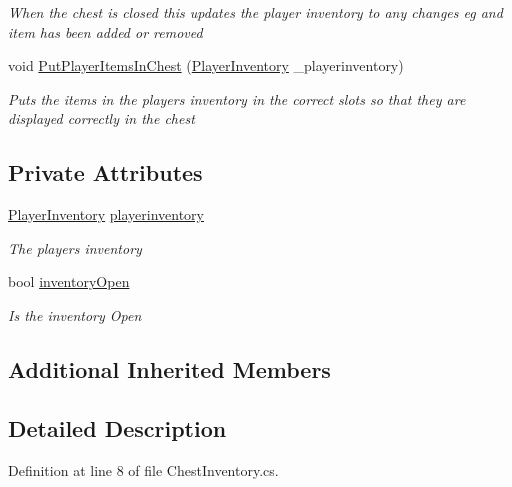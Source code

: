 \begin{DoxyCompactItemize}
\begin{DoxyCompactList}\small\item\em When the chest is closed this updates the player inventory to any changes eg and item has been added or removed \end{DoxyCompactList}\item 
void \hyperlink{class_bee_game_1_1_inventory_1_1_chest_inventory_ac08125dcf875928b702044b7a7b22a01}{Put\+Player\+Items\+In\+Chest} (\hyperlink{class_bee_game_1_1_inventory_1_1_player_inventory}{Player\+Inventory} \+\_\+playerinventory)
\begin{DoxyCompactList}\small\item\em Puts the items in the players inventory in the correct slots so that they are displayed correctly in the chest \end{DoxyCompactList}\end{DoxyCompactItemize}
\subsection*{Private Attributes}
\begin{DoxyCompactItemize}
\item 
\hyperlink{class_bee_game_1_1_inventory_1_1_player_inventory}{Player\+Inventory} \hyperlink{class_bee_game_1_1_inventory_1_1_chest_inventory_a79ff450013724b84c1c21858c63404b0}{playerinventory}
\begin{DoxyCompactList}\small\item\em The players inventory \end{DoxyCompactList}\item 
bool \hyperlink{class_bee_game_1_1_inventory_1_1_chest_inventory_a3e3529178934f2a4a8e91529c148457c}{inventory\+Open}
\begin{DoxyCompactList}\small\item\em Is the inventory Open \end{DoxyCompactList}\end{DoxyCompactItemize}
\subsection*{Additional Inherited Members}


\subsection{Detailed Description}


Definition at line 8 of file Chest\+Inventory.\+cs.



